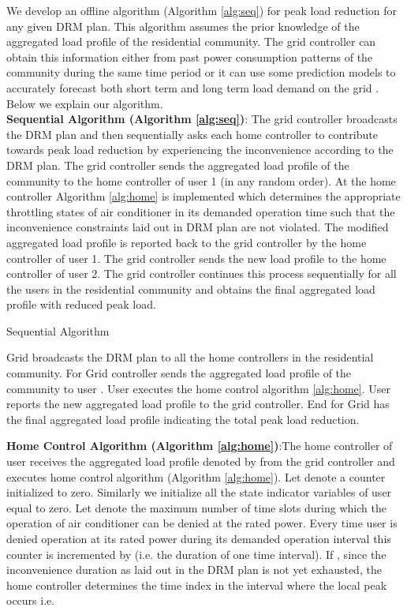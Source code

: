 \documentclass[10pt,twocolumn,twoside]{IEEEtran}
\begin{document}
We develop an offline algorithm (Algorithm \ref{alg:seq}) for peak load reduction for any given DRM plan. This algorithm assumes the prior knowledge of the aggregated load profile of the residential community. The grid controller can obtain this information either from past power consumption patterns of the community during the same time period or it can use some prediction models to accurately forecast both short term and long term load demand on the grid \cite{forecast1,forecast4}. 
Below we explain our algorithm.\\
\textbf{Sequential Algorithm (Algorithm \ref{alg:seq})}: The grid controller broadcasts the DRM plan and then sequentially asks each home controller to contribute towards peak load reduction by experiencing the inconvenience according to the DRM plan. The grid controller sends the aggregated load profile of the community to the home controller of user 1 (in any random order). At the home controller Algorithm \ref{alg:home} is implemented which determines the appropriate throttling states of air conditioner in its demanded operation time such that the inconvenience constraints laid out in DRM plan are not violated. The modified aggregated load profile is reported back to the grid controller by the home controller of user 1. The grid controller sends the new load profile to the home controller of user 2. The grid controller continues this process sequentially for all the users in the residential community and obtains the final aggregated load profile with reduced peak load. \\
\begin{algorithm}[htb]
\caption{Sequential Algorithm}
\label{alg:seq}
\begin{algorithmic}[1]
\STATE Grid broadcasts the DRM plan to all the home controllers in the residential community. 
\STATE For 
\STATE Grid controller sends the aggregated load profile of the community to user .
\STATE User  executes the home control algorithm \ref{alg:home}.
\STATE User  reports the new aggregated load profile to the grid controller.
\STATE End for
\STATE Grid has the final aggregated load profile indicating the total peak load reduction.
\end{algorithmic}
\end{algorithm}
\textbf{Home Control Algorithm (Algorithm \ref{alg:home})}:The home controller of user  receives the aggregated load profile denoted by  from the grid controller and executes home control algorithm (Algorithm \ref{alg:home}). Let  denote a counter initialized to zero. Similarly we initialize all the state indicator variables  of user  equal to zero. Let  denote the maximum number of time slots during which the operation of air conditioner can be denied at the rated power. Every time user is denied operation at its rated power during its demanded operation interval  this counter is incremented by  (i.e. the duration of one time interval). If , since the inconvenience duration as laid out in the DRM plan is not yet exhausted, the home controller determines the time index in the interval  where the local peak occurs i.e. 
\end{document}

